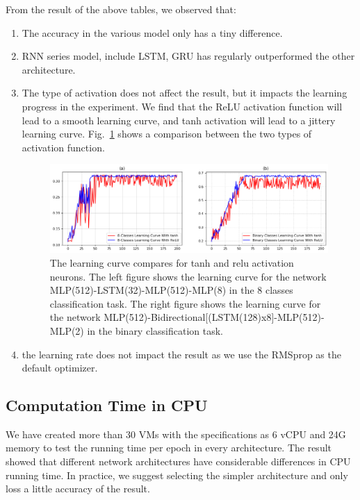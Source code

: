 \documentclass{article}
\begin{document}
From the result of the above tables, we observed that:
\begin{enumerate}
	\item The accuracy in the various model only has a tiny difference.
	\item RNN series model, include LSTM, GRU has regularly outperformed the other architecture.
	\item The type of activation does not affect the result, but it impacts the learning progress in the experiment. We find that the ReLU activation function will lead to a smooth learning curve, and tanh activation will lead to a jittery learning curve. Fig.~\ref{fig:activation_compare} shows a comparison between the two types of activation function.
	\begin{figure}[!htp]
		\begin{centering}
			\includegraphics[width=1.0\textwidth]{tanh_relu.png}
			\caption{The learning curve compares for tanh and relu activation neurons. The left figure shows the learning curve for the network MLP(512)-LSTM(32)-MLP(512)-MLP(8) in the 8 classes classification task. The right figure shows the learning curve for the network MLP(512)-Bidirectional[(LSTM(128)x8]-MLP(512)-MLP(2) in the binary classification task. 
}
			\label{fig:activation_compare} 
		\end{centering}
	\end{figure}
	\item the learning rate does not impact the result as we use the RMSprop as the default optimizer.
\end{enumerate}
\subsection{Computation Time in CPU}
We have created more than 30 VMs with the specifications as 6 vCPU and 24G memory to test the running time per epoch in every architecture. The result showed that different network architectures have considerable differences in CPU running time. In practice, we suggest selecting the simpler architecture and only loss a little accuracy of the result.
\end{document}

